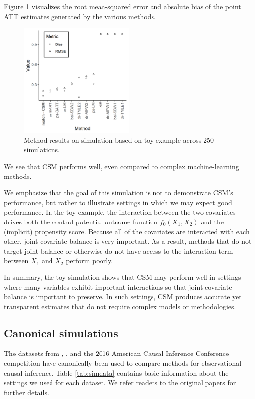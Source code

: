 \documentclass{article}
\begin{document}
Figure \ref{fig:sim_toy_results} visualizes the root mean-squared error and absolute bias of the point ATT estimates generated by the various methods.
\begin{figure}
    \centering
    \includegraphics[width=0.5\textwidth]{writeup/figures/sim_toy_results.png}
    \caption{Method results on simulation based on toy example across 250 simulations.}
    \label{fig:sim_toy_results}
\end{figure}
We see that CSM performs well, even compared to complex machine-learning methods.

We emphasize that the goal of this simulation is not to demonstrate CSM's performance, but rather to illustrate settings in which we may expect good performance.
In the toy example, the interaction between the two covariates drives both the control potential outcome function $f_0(X_1, X_2)$ and the (implicit) propensity score.
Because all of the covariates are interacted with each other, joint covariate balance is very important.
As a result, methods that do not target joint balance or otherwise do not have access to the interaction term between $X_1$ and $X_2$ perform poorly.

In summary, the toy simulation shows that CSM may perform well in settings where many variables exhibit important interactions so that joint covariate balance is important to preserve.
In such settings, CSM produces accurate yet transparent estimates that do not require complex models or methodologies.


\subsection{Canonical simulations}

The datasets from \citet{kang2007demystifying}, \citet{hainmueller2012entropy}, and the 2016 American Causal Inference Conference competition \citep{dorie2019automated} have canonically been used to compare methods for observational causal inference.
Table \ref{tab:simdata} contains basic information about the settings we used for each dataset.
We refer readers to the original papers for further details.
\end{document}
